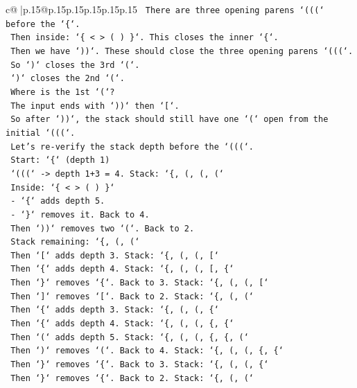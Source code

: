 \documentclass{article}
\begin{document}
{\begin{supertabular}{c@{$\;$}|p{.15\linewidth}@{}p{.15\linewidth}p{.15\linewidth}p{.15\linewidth}p{.15\linewidth}p{.15\linewidth}}
{{{\texttt{   There are three opening parens `(((` before the `\{`.} \\
\texttt{   Then inside: `\{ < > ( ) \}`. This closes the inner `\{`.} \\
\texttt{   Then we have `))`. These should close the three opening parens `(((`.} \\
\texttt{   So `)` closes the 3rd `(`.} \\
\texttt{   `)` closes the 2nd `(`.} \\
\texttt{   Where is the 1st `(`?} \\
\texttt{   The input ends with `))` then `{[}`.} \\
\texttt{   So after `))`, the stack should still have one `(` open from the initial `(((`.} \\
\texttt{   Let's re{-}verify the stack depth before the `(((`.} \\
\texttt{   Start: `\{` (depth 1)} \\
\texttt{   `(((` {-}> depth 1+3 = 4. Stack: `\{, (, (, (`} \\
\texttt{   Inside: `\{ < > ( ) \}`} \\
\texttt{     {-} `\{` adds depth 5.} \\
\texttt{     {-} `\}` removes it. Back to 4.} \\
\texttt{   Then `))` removes two `(`. Back to 2.} \\
\texttt{   Stack remaining: `\{, (, (`} \\
\texttt{   Then `{[}` adds depth 3. Stack: `\{, (, (, {[}`} \\
\texttt{   Then `\{` adds depth 4. Stack: `\{, (, (, {[}, \{`} \\
\texttt{   Then `\}` removes `\{`. Back to 3. Stack: `\{, (, (, {[}`} \\
\texttt{   Then `{]}` removes `{[}`. Back to 2. Stack: `\{, (, (`} \\
\texttt{   Then `\{` adds depth 3. Stack: `\{, (, (, \{`} \\
\texttt{   Then `\{` adds depth 4. Stack: `\{, (, (, \{, \{`} \\
\texttt{   Then `(` adds depth 5. Stack: `\{, (, (, \{, \{, (`} \\
\texttt{   Then `)` removes `(`. Back to 4. Stack: `\{, (, (, \{, \{`} \\
\texttt{   Then `\}` removes `\{`. Back to 3. Stack: `\{, (, (, \{`} \\
\texttt{   Then `\}` removes `\{`. Back to 2. Stack: `\{, (, (`} \\
}}}
\end{supertabular}}
\end{document}
